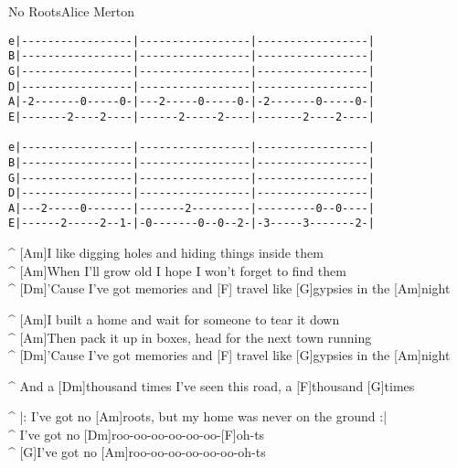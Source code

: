 \begin{song}{No Roots}{Alice Merton}

{\scriptsize
\begin{verbatim}
e|-----------------|-----------------|-----------------|
B|-----------------|-----------------|-----------------|
G|-----------------|-----------------|-----------------|
D|-----------------|-----------------|-----------------|
A|-2-------0-----0-|---2-----0-----0-|-2-------0-----0-|
E|-------2----2----|------2-----2----|-------2----2----|

e|-----------------|-----------------|-----------------|
B|-----------------|-----------------|-----------------|
G|-----------------|-----------------|-----------------|
D|-----------------|-----------------|-----------------|
A|---2-----0-------|-------2---------|---------0--0----|
E|------2-----2--1-|-0-------0--0--2-|-3-----3-------2-|
\end{verbatim}
}

\begin{guitar}
^ [Am]I like digging holes and hiding things inside them\\
^ [Am]When I'll grow old I hope I won't forget to find them\\
^ [Dm]'Cause I've got memories and [F] travel like [G]gypsies in the [Am]night\\
\end{guitar}

\begin{guitar}
^ [Am]I built a home and wait for someone to tear it down\\
^ [Am]Then pack it up in boxes, head for the next town running\\
^ [Dm]'Cause I've got memories and [F] travel like [G]gypsies in the [Am]night\\
\end{guitar}

\begin{guitar}
^ And a [Dm]thousand times I've seen this road, a [F]thousand [G]times\\
\end{guitar}


\begin{guitar}
^ |: I've got no [Am]roots, but my home was never on the ground :|\\
^ I've got no [Dm]roo-oo-oo-oo-oo-oo-[F]oh-ts\\
^ [G]I've got no [Am]roo-oo-oo-oo-oo-oo-oh-ts\\
\end{guitar}



\end{song}
